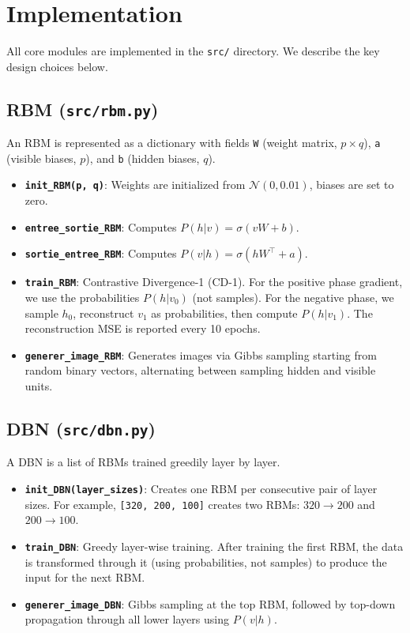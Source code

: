 \documentclass[11pt,a4paper]{article}
\begin{document}
\section{Implementation}
\label{sec:implementation}

All core modules are implemented in the \texttt{src/} directory. We describe the key design choices below.

\subsection{RBM (\texttt{src/rbm.py})}

An RBM is represented as a dictionary with fields \texttt{W} (weight matrix, $p \times q$), \texttt{a} (visible biases, $p$), and \texttt{b} (hidden biases, $q$).

\begin{itemize}
    \item \textbf{\texttt{init\_RBM(p, q)}}: Weights are initialized from $\mathcal{N}(0, 0.01)$, biases are set to zero.
    \item \textbf{\texttt{entree\_sortie\_RBM}}: Computes $P(h|v) = \sigma(v W + b)$.
    \item \textbf{\texttt{sortie\_entree\_RBM}}: Computes $P(v|h) = \sigma(h W^\top + a)$.
    \item \textbf{\texttt{train\_RBM}}: Contrastive Divergence-1 (CD-1). For the positive phase gradient, we use the probabilities $P(h|v_0)$ (not samples). For the negative phase, we sample $h_0$, reconstruct $v_1$ as probabilities, then compute $P(h|v_1)$. The reconstruction MSE is reported every 10 epochs.
    \item \textbf{\texttt{generer\_image\_RBM}}: Generates images via Gibbs sampling starting from random binary vectors, alternating between sampling hidden and visible units.
\end{itemize}

\subsection{DBN (\texttt{src/dbn.py})}

A DBN is a list of RBMs trained greedily layer by layer.

\begin{itemize}
    \item \textbf{\texttt{init\_DBN(layer\_sizes)}}: Creates one RBM per consecutive pair of layer sizes. For example, \texttt{[320, 200, 100]} creates two RBMs: $320 \to 200$ and $200 \to 100$.
    \item \textbf{\texttt{train\_DBN}}: Greedy layer-wise training. After training the first RBM, the data is transformed through it (using probabilities, not samples) to produce the input for the next RBM.
    \item \textbf{\texttt{generer\_image\_DBN}}: Gibbs sampling at the top RBM, followed by top-down propagation through all lower layers using $P(v|h)$.
\end{itemize}
\end{document}
